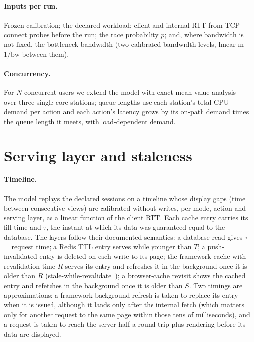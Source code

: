 \documentclass[acmsmall,review,nonacm]{acmart}
\begin{document}
\paragraph{Inputs per run.}
Frozen calibration; the declared workload; client and internal RTT from TCP-connect probes before the run; the race probability $p$; and, where bandwidth is not fixed, the bottleneck bandwidth (two calibrated bandwidth levels, linear in $1/\text{bw}$ between them).

\paragraph{Concurrency.}
For $N$ concurrent users we extend the model with exact mean value analysis~\cite{reiser1980mva} over three single-core stations; queue lengths use each station's total CPU demand per action and each action's latency grows by its on-path demand times the queue length it meets, with load-dependent demand.

\section{Serving layer and staleness}
\label{sec:stale}
\label{sec:outcomes}

\paragraph{Timeline.}
The model replays the declared sessions on a timeline whose display gaps (time between consecutive views) are calibrated without writes, per mode, action and serving layer, as a linear function of the client RTT. Each cache entry carries its fill time and $\tau$, the instant at which its data was guaranteed equal to the database. The layers follow their documented semantics: a database read gives $\tau$ = request time; a Redis TTL entry serves while younger than $T$; a push-invalidated entry is deleted on each write to its page; the framework cache with revalidation time $R$ serves its entry and refreshes it in the background once it is older than $R$ (stale-while-revalidate~\cite{rfc9111}); a browser-cache revisit shows the cached entry and refetches in the background once it is older than $S$. Two timings are approximations: a framework background refresh is taken to replace its entry when it is issued, although it lands only after the internal fetch (which matters only for another request to the same page within those tens of milliseconds), and a request is taken to reach the server half a round trip plus rendering before its data are displayed.
\end{document}
